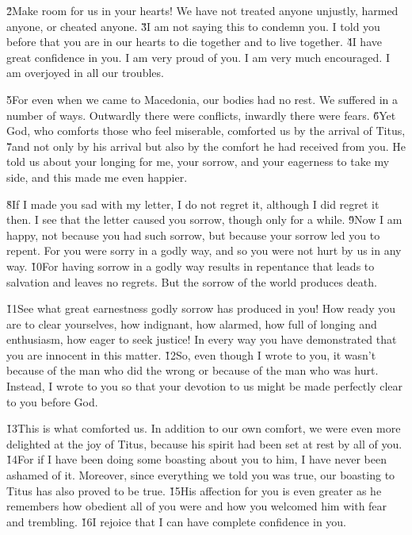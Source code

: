 \v{2}Make room for us in your hearts! We have not treated anyone unjustly, harmed anyone, or cheated anyone. \v{3}I am not saying this to condemn you. I told you before that you are in our hearts to die together and to live together. \v{4}I have great confidence in you. I am very proud of you. I am very much encouraged. I am overjoyed in all our troubles.

\v{5}For even when we came to Macedonia, our bodies had no rest. We suffered in a number of ways. Outwardly there were conflicts, inwardly there were fears. \v{6}Yet God, who comforts those who feel miserable, comforted us by the arrival of Titus, \v{7}and not only by his arrival but also by the comfort he had received from you. He told us about your longing for me, your sorrow, and your eagerness to take my side, and this made me even happier.

\v{8}If I made you sad with my letter, I do not regret it, although I did regret it then. I see that the letter caused you sorrow, though only for a while. \v{9}Now I am happy, not because you had such sorrow, but because your sorrow led you to repent. For you were sorry in a godly way, and so you were not hurt by us in any way. \v{10}For having sorrow in a godly way results in repentance that leads to salvation and leaves no regrets. But the sorrow of the world produces death.

\v{11}See what great earnestness godly sorrow has produced in you! How ready you are to clear yourselves, how indignant, how alarmed, how full of longing and enthusiasm, how eager to seek justice! In every way you have demonstrated that you are innocent in this matter. \v{12}So, even though I wrote to you, it wasn't because of the man who did the wrong or because of the man who was hurt. Instead, I wrote to you so that your devotion to us might be made perfectly clear to you before God.

\v{13}This is what comforted us. In addition to our own comfort, we were even more delighted at the joy of Titus, because his spirit had been set at rest by all of you. \v{14}For if I have been doing some boasting about you to him, I have never been ashamed of it. Moreover, since everything we told you was true, our boasting to Titus has also proved to be true. \v{15}His affection for you is even greater as he remembers how obedient all of you were and how you welcomed him with fear and trembling. \v{16}I rejoice that I can have complete confidence in you.

